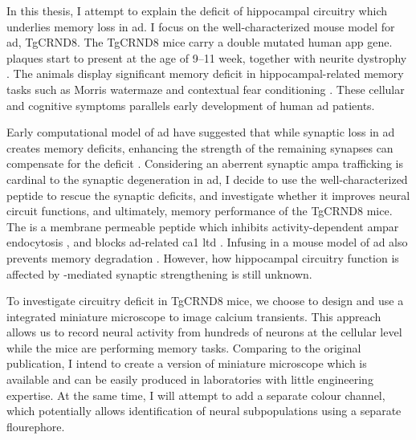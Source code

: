 In this thesis, I attempt to explain the deficit of hippocampal circuitry which underlies memory loss in \gls{ad}. I focus on the well-characterized mouse model for \gls{ad}, TgCRND8. The TgCRND8 mice carry a double mutated human \gls{app} gene. \abeta{} plaques start to present at the age of 9--11 week, together with neurite dystrophy \citep{chishiti01}. The animals display significant memory deficit in hippocampal-related memory tasks such as Morris watermaze and contextual fear conditioning \citep{hyde05, yiu11}. These cellular and cognitive symptoms parallels early development of human \gls{ad} patients. 

Early computational model of \gls{ad} have suggested that while synaptic loss in \gls{ad} creates memory deficits, enhancing the strength of the remaining synapses can compensate for the deficit \citep{horn93}. Considering an aberrent synaptic \gls{ampa} trafficking is cardinal to the synaptic degeneration in \gls{ad}, I decide to use the well-characterized peptide \tglu to rescue the synaptic deficits, and investigate whether it improves neural circuit functions, and ultimately, memory performance of the TgCRND8 mice. The \tglu is a membrane permeable peptide which inhibits activity-dependent \gls{ampar} endocytosis \citep{ahmadian04}, and blocks \gls{ad}-related \gls{ca1} \gls{ltd} \citep{dong15}. Infusing \tglu in a mouse model of \gls{ad} also prevents memory degradation \citep{dong15}. However, how hippocampal circuitry function is affected by \tglu-mediated synaptic strengthening is still unknown. 

To investigate circuitry deficit in TgCRND8 mice, we choose to design and use a integrated miniature microscope to image calcium transients. This appreach allows us to record neural activity from hundreds of neurons at the cellular level while the mice are performing memory tasks. Comparing to the original \citet{ghosh11} publication, I intend to create a version of miniature microscope which is available and can be easily produced in laboratories with little engineering expertise. At the same time, I will attempt to add a separate colour channel, which potentially allows identification of neural subpopulations using a separate flourephore. 

